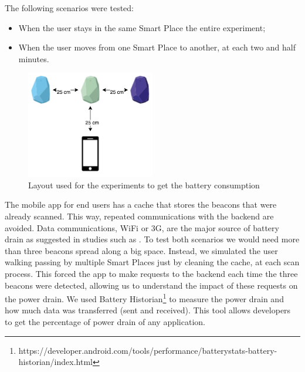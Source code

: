 The following scenarios were tested:
\begin{itemize}
  \item
  When the user stays in the same Smart Place the entire experiment;
  \item
  When the user moves from one Smart Place to another, at each two and half minutes.
\end{itemize}



\begin{figure}[!ht]
  \centering
    \includegraphics[width=0.5\textwidth, keepaspectratio]{images/experiments_battery_layout}
    \caption[Layout for experiments of battery consumption]{Layout used for the experiments to get the battery consumption}
    \label{fig:layout_experiments_battery_consumption}
\end{figure}

The mobile app for end users has a cache that stores the beacons that were already scanned.
This way, repeated communications with the backend are avoided.
Data communications, \gls{WiFi} or \gls{3G}, are the major source of battery drain as suggested in studies such as \cite{energy}.
To test both scenarios we would need more than three beacons spread along a big space.
Instead, we simulated the user walking passing by multiple Smart Places just by cleaning the cache, at each scan process.
This forced the app to make requests to the backend each time the three beacons were detected, allowing us to understand the impact of these requests on the power drain.
We used Battery Historian\footnote{https://developer.android.com/tools/performance/batterystats-battery-historian/index.html} to measure the power drain and how much data was transferred (sent and received). This tool allows developers to get the percentage of power drain of any application.

